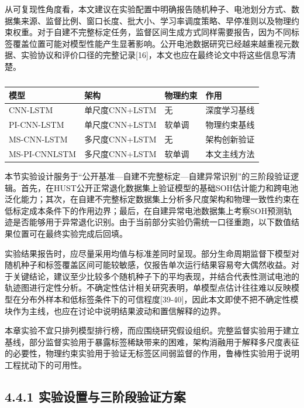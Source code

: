 \documentclass[12pt, a4paper]{ctexart}
\begin{document}
从可复现性角度看，本文建议在实验配置中明确报告随机种子、电池划分方式、数据集来源、监督比例、窗口长度、批大小、学习率调度策略、早停准则以及物理约束权重。对于自建不完整标定任务，监督区间生成方式同样需要报告，因为不同标签覆盖位置可能对模型性能产生显著影响。公开电池数据研究已经越来越重视元数据、实验协议和评价口径的完整记录[16]，本文也应在最终论文中将这些信息写清楚。




\begin{table}[H]
  \centering
  \begin{tabular}{llll}
  \toprule
  模型 & 架构 & 物理约束 & 作用 \\
  \midrule
  CNN-LSTM & 单尺度CNN+LSTM & 无 & 深度学习基线 \\
  PI-CNN-LSTM & 单尺度CNN+LSTM & 软单调 & 物理约束基线 \\
  MS-CNN-LSTM & 多尺度CNN+LSTM & 无 & 架构创新验证 \\
  MS-PI-CNNLSTM & 多尺度CNN+LSTM & 软单调 & 本文主线方法 \\
  \bottomrule
  \end{tabular}
  \caption{}
  \label{tab:}
\end{table}


本节实验设计服务于“公开基准—自建不完整标定—自建异常识别”的三阶段验证逻辑。首先，在HUST公开正常退化数据集上验证模型的基础SOH估计能力和跨电池泛化能力；其次，在自建不完整标定数据集上分析多尺度架构和物理一致性约束在低标定成本条件下的作用边界；最后，在自建异常电池数据集上考察SOH预测轨迹是否能够用于异常退化识别。由于当前部分实验仍需统一口径重跑，以下数值结果位置可在最终实验完成后回填。


实验结果报告时，应尽量采用均值与标准差同时呈现。部分生命周期监督下模型对随机种子和标签覆盖区间可能较敏感，仅报告单次运行结果容易夸大偶然收益。对于关键结论，建议至少比较多个随机种子下的平均表现，并结合代表性测试电池的轨迹图进行定性分析。不确定性估计相关研究表明，单模型点估计往往难以反映模型在分布外样本和低标签条件下的可信程度[39-40]，因此本文即使不把不确定性模块作为主线，也应在讨论中说明结果波动和置信解释的边界。


本章实验不宜只排列模型排行榜，而应围绕研究假设组织。完整监督实验用于建立基线，部分监督实验用于暴露标签稀缺带来的困难，架构消融用于解释多尺度表征的必要性，物理约束实验用于验证无标签区间弱监督的作用，鲁棒性实验用于说明工程扰动下的可用性。



\subsection{4.4.1 实验设置与三阶段验证方案}
\end{document}
